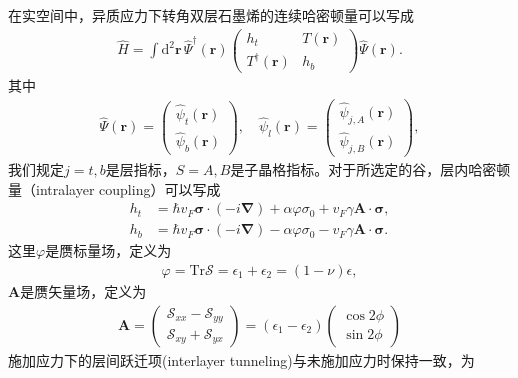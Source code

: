 \documentclass[10pt, oneside]{article}
\begin{document}
在实空间中，异质应力下转角双层石墨烯的连续哈密顿量可以写成
\begin{align}
	\hat{H } = \int \mathrm{d}^{2 } \bm{r } \, \hat{\Psi}^{\dagger} \left(\bm{r }\right) \begin{pmatrix}
		h_t & T \left(\bm{r }\right) \\ T^{\dagger} \left(\bm{r }\right) & h_b 
	\end{pmatrix} \hat{\Psi} \left(\bm{r }\right).
\end{align}
其中
\begin{align}
	\hat{\Psi} \left(\bm{r }\right) = \begin{pmatrix}
		\hat{\psi}_{t } \left(\bm{r }\right) \\ \hat{\psi}_{b} \left(\bm{r }\right)
	\end{pmatrix}, \quad \hat{\psi}_{l } \left(\bm{r }\right) = \begin{pmatrix}
		\hat{\psi}_{j,A } \left(\bm{r }\right) \\ \hat{\psi}_{j,B} \left(\bm{r }\right)
	\end{pmatrix},
\end{align}
我们规定\(j = t,b\)是层指标，\(S = A,B\)是子晶格指标。对于所选定的谷，层内哈密顿量（intralayer coupling）可以写成
\begin{align}
	h_t & = \hbar v_{F} \bm{\sigma} \cdot  \left(-i \bm{\nabla} \right) + \alpha \varphi \sigma_{0} + v_{F}	\gamma \bm{A } \cdot \bm{\sigma}, \\
	h_b & =  \hbar v_{F} \bm{\sigma} \cdot  \left(-i \bm{\nabla} \right) - \alpha \varphi \sigma_{0} - v_{F}	\gamma \bm{A } \cdot \bm{\sigma}.
\end{align}
这里\(\varphi\)是赝标量场，定义为
\begin{align}
	\varphi = \mathrm{Tr} \mathcal{S } = \epsilon_{1} + \epsilon_{2} = \left(1 - \nu\right) \epsilon,
\end{align}
\(\bm{A}\)是赝矢量场，定义为
\begin{align}
	\bm{A} = \begin{pmatrix}
		\mathcal{S}_{xx} - \mathcal{S}_{yy} \\  \mathcal{S}_{xy} + \mathcal{S}_{yx}
	\end{pmatrix} = \left(\epsilon_{1} - \epsilon_{2}\right) \begin{pmatrix}
		 \cos{2 \phi} \\  \sin{2 \phi}
	\end{pmatrix}
\end{align}
施加应力下的层间跃迁项(interlayer tunneling)与未施加应力时保持一致，为
\end{document}
